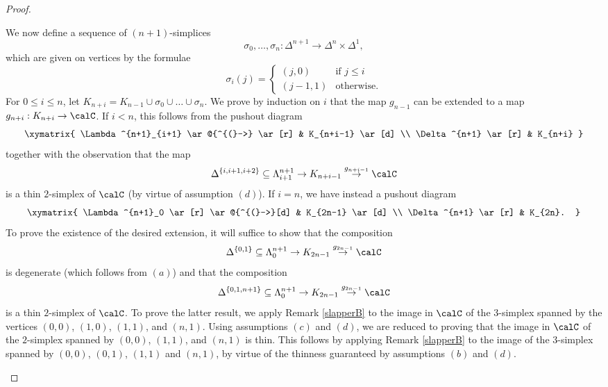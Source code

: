 \begin{proof}
\begin{itemize}
We now define a sequence of $(n+1)$-simplices
$$ \sigma_0, \ldots, \sigma_n: \Delta^{n+1} \rightarrow \Delta^n \times \Delta^1,$$
which are given on vertices by the formulae
$$ \sigma_{i}(j) = \begin{cases} (j,0) & \text{if } j \leq i \\
(j-1, 1) & \text{otherwise.} \end{cases}$$
For $0 \leq i \leq n$, let $K_{n+i} = K_{n-1} \cup \sigma_0 \cup \ldots \cup \sigma_{n}$.
We prove by induction on $i$ that the map $g_{n-1}$ can be extended to a map
$g_{n+i}: K_{n+i} \rightarrow \calC$. If $i < n$, this follows from the pushout diagram
$$ \xymatrix{ \Lambda^{n+1}_{i+1} \ar@{^{(}->} \ar[r] & K_{n+i-1} \ar[d] \\
\Delta^{n+1} \ar[r] & K_{n+i} }$$
together with the observation that the map
$$ \Delta^{ \{i, i+1, i+2 \} } \subseteq \Lambda^{n+1}_{i+1}
\rightarrow K_{n+i-1} \stackrel{g_{n+i-1} }{\rightarrow} \calC$$
is a thin $2$-simplex of $\calC$ (by virtue of assumption $(d)$). If $i=n$, we have instead a pushout diagram
$$ \xymatrix{ \Lambda^{n+1}_0 \ar[r] \ar@{^{(}->}[d] & K_{2n-1} \ar[d] \\
\Delta^{n+1} \ar[r] & K_{2n}. }$$
To prove the existence of the desired extension, it will suffice to show that the composition
$$ \Delta^{ \{0,1\} } \subseteq \Lambda^{n+1}_0 \rightarrow K_{2n-1} \stackrel{g_{2n-1}}{\rightarrow} \calC$$ is degenerate (which follows from $(a)$) and that the composition
$$ \Delta^{ \{0,1, n+1\} } \subseteq \Lambda^{n+1}_0 \rightarrow K_{2n-1} \stackrel{g_{2n-1}}{\rightarrow} \calC$$ is a thin $2$-simplex of $\calC$. To prove the latter result, we apply
Remark \ref{slapperB} to the image in $\calC$ of the $3$-simplex spanned by
the vertices $(0,0)$, $(1,0)$, $(1,1)$, and $(n,1)$. Using assumptions $(c)$ and $(d)$, we are
reduced to proving that the image in $\calC$ of the $2$-simplex spanned by $(0,0)$, $(1,1)$, and $(n,1)$ is thin. This follows by applying Remark \ref{slapperB} to the image of the $3$-simplex spanned by
$(0,0)$, $(0,1)$, $(1,1)$ and $(n,1)$, by virtue of the thinness guaranteed by assumptions
$(b)$ and $(d)$.


\end{itemize}
\end{proof}
